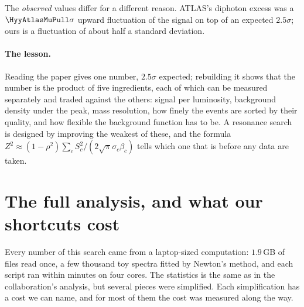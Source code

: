 The \emph{observed} values differ for a different reason. ATLAS's diphoton excess was a
$\HyyAtlasMuPull\sigma$ upward fluctuation of the signal on top of an expected
$2.5\sigma$; ours is a fluctuation of about half a standard deviation.

\paragraph{The lesson.}
Reading the paper gives one number, $2.5\sigma$ expected; rebuilding it shows that the
number is the product of five ingredients, each of which can be measured separately and
traded against the others: signal per luminosity, background density under the peak,
mass resolution, how finely the events are sorted by their quality, and how flexible the
background function has to be. A resonance search
is designed by improving the weakest of these, and the formula
$Z^2\approx(1-\rho^2)\sum_cS_c^2/(2\sqrt\pi\sigma_c\beta_c)$ tells which one that is before
any data are taken.
\section{The full analysis, and what our shortcuts cost}
\label{13d:sec:nerfs}

Every number of this search came from a laptop-sized computation: $1.9\,$GB of files read
once, a few thousand toy spectra fitted by Newton's method, and each script ran within
minutes on four cores. The statistics is the same as in the collaboration's analysis, but
several pieces were simplified. Each simplification has a cost we can name, and for most
of them the cost was measured along the way.

